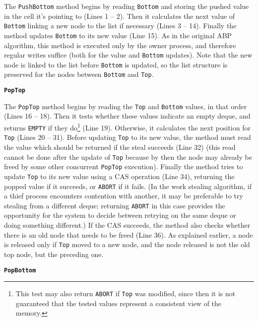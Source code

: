 The \lstinline!PushBottom! method begins by reading \lstinline!Bottom!
and storing the pushed value in the cell it's pointing to (Lines
1 -- 2). Then it calculates the next value of \lstinline!Bottom! linking
a new node to the list if necessary (Lines 3 -- 14). Finally the method
updates \lstinline!Bottom! to its new value (Line 15). As in the
original ABP algorithm, this method is executed only by the owner
process, and therefore regular writes suffice (both for the value and
\lstinline!Bottom! updates). Note that the new node is linked to the
list before \lstinline!Bottom! is updated, so the list structure is
preserved for the nodes between \lstinline!Bottom! and
\lstinline!Top!.

\textbf{\lstinline!PopTop!}

The \lstinline!PopTop! method begins by reading the \lstinline!Top!
and \lstinline!Bottom! values, in that order (Lines 16 -- 18). Then it
tests whether these values indicate an empty deque, and returns
\lstinline!EMPTY! if they do\footnote{This test may also return
  \lstinline!ABORT! if \lstinline!Top! was modified, since then it is
  not guaranteed that the tested values represent a consistent view of
  the memory.} (Line 19). Otherwise, it calculates the next position
for \lstinline!Top! (Lines 20 -- 31). Before updating \lstinline!Top! to
its new value, the method must read the value which should be returned
if the steal succeeds (Line 32) (this read cannot be done after the
update of \lstinline!Top! because by then the node may already be
freed by some other concurrent \lstinline!PopTop! execution). Finally
the method tries to update \lstinline!Top! to its new value using a
CAS operation (Line 34), returning the popped value if it succeeds, or
\lstinline!ABORT! if it fails. (In the work stealing algorithm, if a
thief process encounters contention with another, it may be preferable
to try stealing from a different deque; returning \lstinline!ABORT! in
this case provides the opportunity for the system to decide between
retrying on the same deque or doing something different.) If the CAS
succeeds, the method also checks whether there is an old node that
needs to be freed (Line 36). As explained earlier, a node is released
only if \lstinline!Top! moved to a new node, and the node released is
not the old top node, but the preceding one.

\textbf{\lstinline!PopBottom!}

